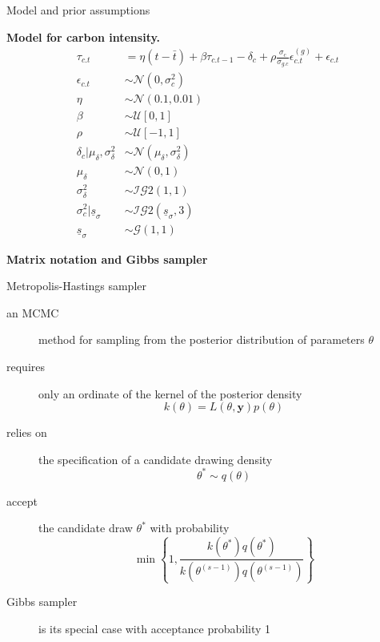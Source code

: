 \documentclass[notes,blackandwhite,mathsans,usenames,dvipsnames]{beamer}
\begin{document}
\begin{frame}{Model and prior assumptions}

\textbf{Model for carbon intensity.}\small
\begin{align*}
\tau_{c.t} &= \eta (t-\bar{t}) + \beta \tau_{c.t-1} - \delta_{c} + \rho\frac{\sigma_c}{\sigma_{g.c}}\epsilon_{c.t}^{(g)}   + \epsilon_{c.t}\\
\epsilon_{c.t} &\sim\mathcal{N}\left( 0,\sigma_{c}^2 \right)\\[2ex]
\eta&\sim \mathcal{N}\left( 0.1,0.01 \right)\\
\beta&\sim \mathcal{U}[0,1]\\
\rho&\sim\mathcal{U}[-1,1]\\[1ex]
\delta_c|\mu_\delta,\sigma_\delta^2&\sim\mathcal{N}\left(\mu_\delta,\sigma_\delta^2\right) \\
\mu_\delta&\sim\mathcal{N}(0,1) \\
\sigma_\delta^2 &\sim\mathcal{IG}2(1,1) \\[1ex]
\sigma_{c}^2|\underline{s}_\sigma &\sim\mathcal{IG}2\left(\underline{s}_\sigma,3\right)\\
\underline{s}_\sigma &\sim\mathcal{G}(1,1)
\end{align*}

\end{frame}








{
\begin{frame}

\begin{adjustwidth}{-0.5cm}{0cm}
\vspace{8.3cm}\Large
\textbf{{\color{gre}Matrix notation} {\color{yel}and Gibbs sampler}}
\end{adjustwidth}

\end{frame}
}



\begin{frame}{Metropolis-Hastings sampler}

\begin{description}
\item[an MCMC] method for sampling from the posterior distribution of parameters $\theta$
\item[requires] only an ordinate of the kernel of the posterior density
$$ k(\theta) = L(\theta,\mathbf{y})p(\theta) $$
\item[relies on] the specification of a candidate drawing density
$$ \theta^*\sim q(\theta) $$
\item[accept] the candidate draw $\theta^*$ with probability
$$ \min\left\{1, \frac{k(\theta^*)q(\theta^*)}{k(\theta^{(s-1)})q(\theta^{(s-1)})}\right\} $$
\item[Gibbs sampler] is its special case with acceptance probability 1
\end{description}

\end{frame}
\end{document}
